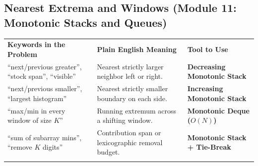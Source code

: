 \documentclass[11pt,a4paper]{article}
\begin{document}
\subsection{Nearest Extrema and Windows (Module 11: Monotonic Stacks and Queues)}
\begingroup\footnotesize{}
\begin{tabularx}{\textwidth}{>{\raggedright\arraybackslash}p{4.4cm} >{\raggedright\arraybackslash}X >{\raggedright\arraybackslash\bfseries}p{4.0cm}}
\arrayrulecolor{primaryblue}\toprule[1.1pt]
\rowcolor{primaryblue!10}
\textcolor{primaryblue}{\textbf{Keywords in the Problem}} & \textcolor{primaryblue}{\textbf{Plain English Meaning}} & \textcolor{primaryblue}{\textbf{Tool to Use}} \\
\arrayrulecolor{codeframe}\midrule[0.6pt]
``next/previous greater'', ``stock span'', ``visible'' & Nearest strictly larger neighbor left or right. & Decreasing Monotonic Stack \\
``next/previous smaller'', ``largest histogram'' & Nearest strictly smaller boundary on each side. & Increasing Monotonic Stack \\
``max/min in every window of size $K$'' & Running extremum across a shifting window. & Monotonic Deque ($O(N)$) \\
``sum of subarray mins'', ``remove $K$ digits'' & Contribution span or lexicographic removal budget. & Monotonic Stack + Tie-Break \\
\arrayrulecolor{primaryblue}\bottomrule[1.1pt]
\end{tabularx}\endgroup
\end{document}
